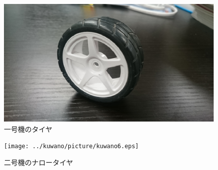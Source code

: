 \begin{figure}[H]
  \begin{center}
    \includegraphics[width=1.0\hsize]{../kuwano/picture/kuwano5.eps}
    \caption{一号機のタイヤ}
    \label{kuwano5}
  \end{center}
\end{figure}

\begin{figure}[H]
  \begin{center}
    \texttt{[image: ../kuwano/picture/kuwano6.eps]}
    \caption{二号機のナロータイヤ}
    \label{kuwano6}
  \end{center}
\end{figure}
